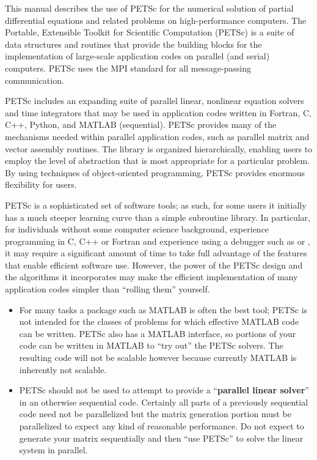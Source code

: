 
%
%

\medskip \medskip
This manual describes the use of PETSc for the numerical solution
of partial differential equations and related problems
on high-performance computers.  The
Portable, Extensible Toolkit for Scientific Computation (PETSc) is a
suite of data structures and routines that provide the building
blocks for the implementation of large-scale application codes on parallel
(and serial) computers.  PETSc uses the MPI standard for all
message-passing communication.

PETSc includes an expanding suite of parallel linear, nonlinear
equation solvers and time integrators that may be
used in application codes written in Fortran, C, C++, Python, and MATLAB (sequential).  PETSc
provides many of the mechanisms needed within parallel application
codes, such as parallel matrix and vector assembly routines. The library is
organized hierarchically, enabling users to employ the level of
abstraction that is most appropriate for a particular problem. By
using techniques of object-oriented programming, PETSc provides
enormous flexibility for users.

PETSc is a sophisticated set of software tools; as such, for some
users it initially has a much steeper learning curve than a simple
subroutine library. In particular, for individuals without some
computer science background, experience programming in C, C++ or Fortran and experience using a debugger such as  or , it
may require a significant amount of time to take full advantage of the
features that enable efficient software use.  However, the power of
the PETSc design and the algorithms it incorporates may make the efficient
implementation of many application codes simpler than ``rolling
them'' yourself.
\begin{itemize}
\item  For many tasks a package such as MATLAB is often the best tool; PETSc is not
intended for the classes of problems for which effective MATLAB code
can be written. PETSc also has a MATLAB interface, so portions of your code can be written in MATLAB to ``try out'' the PETSc solvers.
The resulting code will not be scalable however because currently MATLAB is inherently not scalable.
\item PETSc should not be used to attempt to provide
a ``{\bf parallel linear solver}'' in an otherwise sequential code.
Certainly all parts of a previously sequential code need not be parallelized but the
matrix generation portion must be parallelized to expect any kind of reasonable performance.
Do not expect to generate your matrix sequentially and then ``use PETSc'' to solve
the linear system in parallel.
\end{itemize}

